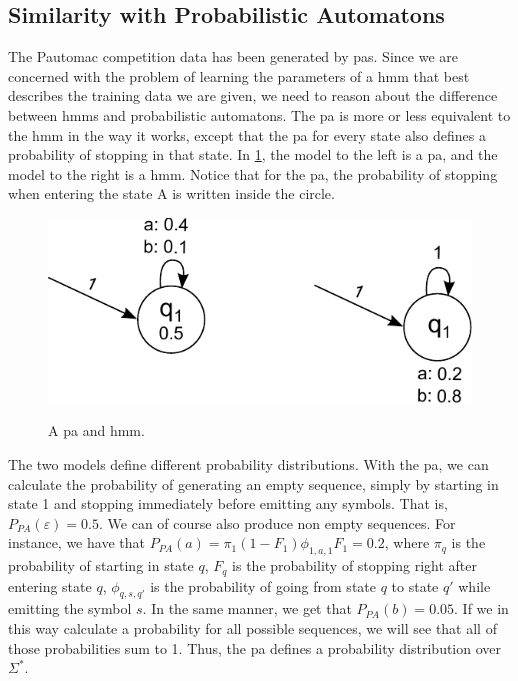 \subsection{Similarity with Probabilistic Automatons}
The Pautomac competition data has been generated by \gls{pa}s. Since we are concerned with the problem of learning the parameters of a \gls{hmm} that best describes the training data we are given, we need to reason about the difference between \gls{hmm}s and probabilistic automatons. The \gls{pa} is more or less equivalent to the \gls{hmm} in the way it works, except that the \gls{pa} for every state also defines a probability of stopping in that state.
In \ref{fig:model-with-and-without-stop-symbols}, the model to the left is a \gls{pa}, and the model to the right is a \gls{hmm}.
Notice that for the \gls{pa}, the probability of stopping when entering the state A is written inside the circle.

\begin{figure}
\begin{centering}
\includegraphics[scale=1]{./pictures/model-with-and-without-stop-symbols.pdf}
\label{fig:model-with-and-without-stop-symbols}
\caption{A \gls{pa} and \gls{hmm}.}
\end{centering}
\end{figure}

The two models define different probability distributions.
With the \gls{pa}, we can calculate the probability of generating an empty sequence, simply by starting in state 1 and stopping immediately before emitting any symbols. That is, $P_{PA}(\varepsilon) = 0.5$. We can of course also produce non empty sequences. For instance, we have that $P_{PA}(a) = \pi_1(1-F_1)\phi_{1,a,1}F_1 = 0.2$, where $\pi_q$ is the probability of starting in state $q$, $F_q$ is the probability of stopping right after entering state $q$, $\phi_{q,s,q'}$ is the probability of going from state $q$ to state $q'$ while emitting the symbol $s$.
In the same manner, we get that $P_{PA}(b) = 0.05$.
If we in this way calculate a probability for all possible sequences, we will see that all of those probabilities sum to 1. Thus, the \gls{pa} defines a probability distribution over $\Sigma^\ast$\cite{Dupont:2005:LPA:1746577.1746601}.

